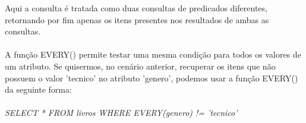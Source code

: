 Aqui a consulta é tratada como duas consultas de predicados diferentes, retornando por fim apenas os itens presentes nos resultados de ambas as consultas.\\\\

A função EVERY() permite testar uma mesma condição para todos os valores de um atributo. Se quisermos, no cenário anterior, recuperar os itens que não possuem o valor 'tecnico' no atributo 'genero', podemos usar a função EVERY() da seguinte forma: \\\\

\textit{SELECT * FROM livros WHERE EVERY(genero) != 'tecnico'}